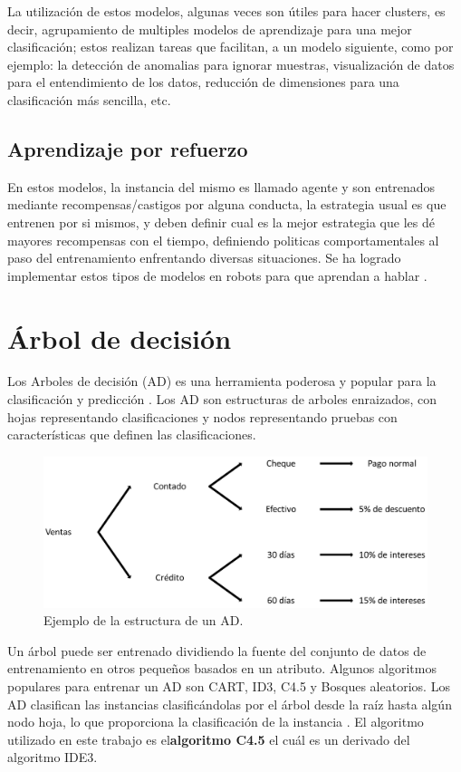 \documentclass[twoside,spanish,ESP,MSc]{plantillaLabUPV}
\theoremstyle{definition}
\begin{document}
La utilización de estos modelos, algunas veces son útiles para hacer clusters, es decir, agrupamiento de multiples modelos de aprendizaje para una mejor clasificación; estos realizan tareas que facilitan, a un modelo siguiente, como por ejemplo: la detección de anomalias para ignorar muestras, visualización de datos para el entendimiento de los datos, reducción de dimensiones para una clasificación más sencilla, etc.

\subsection{Aprendizaje por refuerzo}

En estos modelos, la instancia del mismo es llamado agente y son entrenados mediante recompensas/castigos por alguna conducta, la estrategia usual es que entrenen por si mismos, y deben definir cual es la mejor estrategia que les dé mayores recompensas con el tiempo, definiendo politicas comportamentales al paso del entrenamiento enfrentando diversas situaciones. Se ha logrado implementar estos tipos de modelos en robots para que aprendan a hablar \cite{supervisadobook}.


\section{Árbol de decisión}

Los Arboles de decisión (AD) es una herramienta poderosa y popular para la clasificación y predicción \cite{cart84}. Los AD son estructuras de arboles enraizados, con hojas representando clasificaciones y nodos representando pruebas con características que definen las clasificaciones.

\begin{figure}[!tbh] 
	\centering 
		\includegraphics[scale=.30]{ima/add} 
	\caption{Ejemplo de la estructura de un AD.} 
	\label{add} 
\end{figure}


Un árbol puede ser entrenado dividiendo la fuente del conjunto de datos de entrenamiento en otros pequeños basados en un atributo. Algunos algoritmos populares para entrenar un AD son CART, ID3, C4.5 y Bosques aleatorios.  Los AD clasifican las instancias clasificándolas por el árbol desde la raíz hasta algún nodo hoja, lo que proporciona la clasificación de la instancia \cite{Mitchell:1997:ML:541177}. El algoritmo utilizado en este trabajo es el\textbf{algoritmo C4.5} el cuál es un derivado del algoritmo IDE3.
\end{document}
